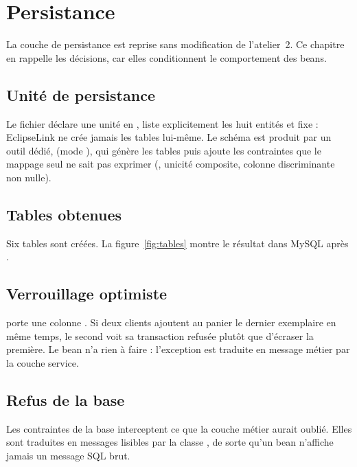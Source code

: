 \chapter{Persistance}\label{chap:persistance}

La couche de persistance est reprise sans modification de l'atelier~2. Ce chapitre en rappelle les décisions, car
elles conditionnent le comportement des beans.

\section{Unité de persistance}
Le fichier  déclare une unité en , liste explicitement les huit entités et
fixe  : EclipseLink ne crée jamais les tables lui-même. Le schéma est produit par un outil
dédié,  (mode ), qui génère les tables puis ajoute les contraintes que le mappage seul ne
sait pas exprimer (, unicité composite, colonne discriminante non nulle).

\section{Tables obtenues}
Six tables sont créées. La figure~\ref{fig:tables} montre le résultat dans MySQL après .


\section{Verrouillage optimiste}
 porte une colonne . Si deux clients ajoutent au panier le dernier exemplaire en même
temps, le second voit sa transaction refusée plutôt que d'écraser la première. Le bean n'a rien à faire : l'exception
est traduite en message métier par la couche service.

\section{Refus de la base}
Les contraintes de la base interceptent ce que la couche métier aurait oublié. Elles sont traduites en messages
lisibles par la classe , de sorte qu'un bean n'affiche jamais un message SQL brut.
